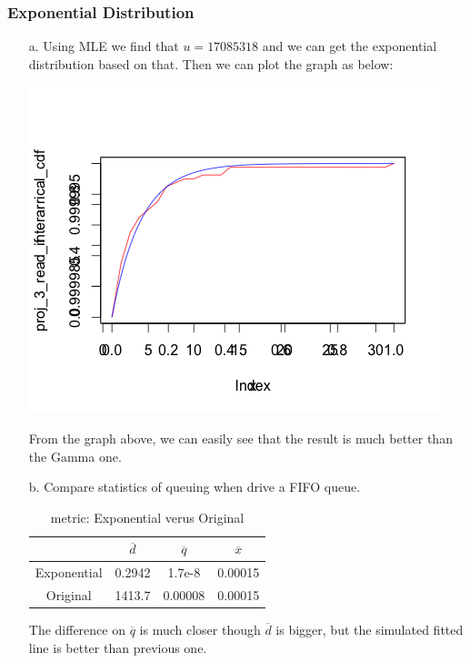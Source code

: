 \documentclass[11pt]{article}
\begin{document}
\subsubsection{Exponential Distribution}
\begin{enumerate}
\item[a.]
Using MLE we find that $u=17085318$ and we can get the exponential distribution based on that. Then we can plot the graph as below:
\begin{center}
\includegraphics[scale=0.5]{write_exp_cdf.png}
\end{center}
From the graph above, we can easily see that the result is much better than the Gamma one.



\item[b.]
Compare statistics of queuing when drive a FIFO queue.
\begin{table}[htdp]
\caption{metric: Exponential verus Original}
\begin{center}
\begin{tabular}{c|c|c|c}
	& $\overline{d}$ & $\overline{q}$ & $\overline{x}$ \\
\hline
Exponential & 0.2942 & 1.7e-8 & 0.00015 \\
\hline
Original &1413.7 & 0.00008 & 0.00015
\end{tabular}
\end{center}
\label{default}
\end{table}%
The difference on $\overline{q}$ is much closer though $\overline{d}$ is bigger, but the simulated fitted line is better than previous one.
\end{enumerate}
\end{document}
